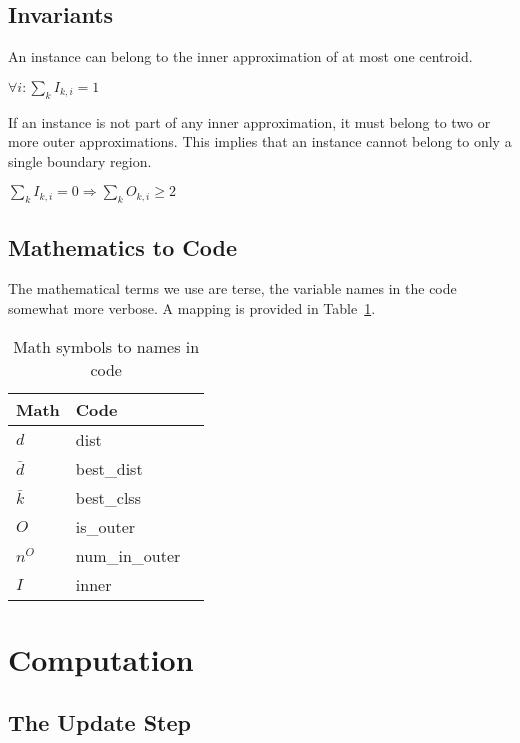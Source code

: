 \subsection{Invariants}

\begin{invariant}
An instance can belong to the inner approximation of at most one centroid.

\(\forall i: \sum_k I_{k, i} = 1\)
\end{invariant}

\begin{invariant}
If an instance is not part of any inner approximation, it must belong to 
two or more outer approximations. This implies that an instance cannot belong to only a single boundary region.

\(\sum_k I_{k, i} = 0 \Rightarrow \sum_k O_{k, i} \geq 2\)

\end{invariant}


\subsection{Mathematics to Code}
\label{math_to_code}
The mathematical terms we use are terse, the variable names in the code somewhat
more verbose. A mapping is provided in Table~\ref{tbl_mapping}.
\begin{table}[htbp]
\centering
\begin{tabular}{|l|l|l|} \hline
{\bf Math}     & {\bf Code}      \\ \hline
\(d\) & dist \\ \hline
\(\bar{d}\) & best\_dist \\ \hline
\(\bar{k}\) & best\_clss \\ \hline
\(O\) & is\_outer \\ \hline
\(n^O\) & num\_in\_outer \\ \hline
\(I\) & inner \\ \hline
\hline
\end{tabular}
\caption{Math symbols to names in code}
\label{tbl_mapping}
\end{table}


\section{Computation}

\subsection{The Update Step}
\label{update}

